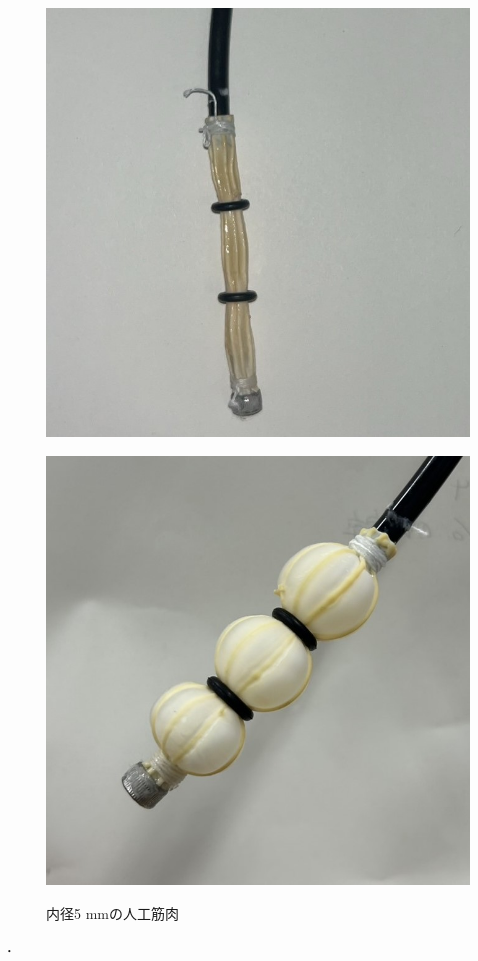 \begin{figure}[htbp]
  \begin{minipage}{0.49\columnwidth}
    \vspace{4mm}
    \centering
    \includegraphics[scale=0.3]{pic/D.jpg}
 
    \label{fig:inn}
  \end{minipage}
  \begin{minipage}{0.49\columnwidth}
    \vspace{4mm}
    \centering
    \includegraphics[scale=0.3]{pic/E.jpg}
    \label{fig:ato}
  \end{minipage}
  \caption{内径5 mmの人工筋肉}
  \label{fig:zzA}
\end{figure}．


